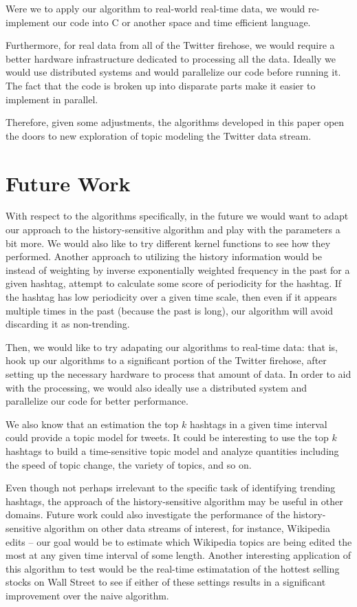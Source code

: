 \documentclass[twoside]{article}
\begin{document}
{Were we to apply our algorithm to real-world real-time data, we would re-implement our code into C or another space and time efficient language. 

Furthermore, for real data from all of the Twitter firehose, we would require a better hardware infrastructure dedicated to processing all the data. Ideally we would use distributed systems and would
parallelize our code before running it. The fact that the code is broken up into disparate parts make it easier to implement in parallel.

Therefore, given some adjustments, the algorithms developed in this paper open the doors to new exploration of topic modeling the Twitter data stream.


\section{Future Work} \label{sec:Future Work}

With respect to the algorithms specifically, in the future we would want to adapt our approach to the history-sensitive algorithm and play with the parameters a bit more. We would also like to try different kernel functions to see how they performed. Another approach to utilizing the history information would be instead of weighting by inverse exponentially weighted frequency in the past for a given hashtag, attempt to calculate some score of periodicity for the hashtag. If the hashtag has low periodicity over a given time scale, then even if it appears multiple times in the past (because the past is long), our algorithm will avoid discarding it as non-trending.

Then, we would like to try adapating our algorithms to real-time data: that is, hook up our algorithms to a significant portion of the Twitter firehose, after setting up the necessary hardware to process that amount of data. In order to aid with the processing, we would also ideally use a distributed system and parallelize
our code for better performance.

We also know that an estimation the top $k$ hashtags in a given time interval could provide a topic model for tweets. It could be interesting to use the top $k$ hashtags to build a time-sensitive topic model and analyze quantities including the speed of topic change, the variety of topics, and so on.

Even though not perhaps irrelevant to the specific task of identifying trending hashtags, 
the approach of the history-sensitive algorithm may be useful in other domains.
Future work could also investigate the performance of the history-sensitive algorithm on other data streams of interest, for instance, Wikipedia edits -- our goal would be to estimate which Wikipedia topics are being edited the most at any given time interval of some length. Another interesting application of this algorithm to test would be the real-time estimatation of the hottest selling stocks on Wall Street to see if either of these settings results in a significant improvement over the naive algorithm.

}
\end{document}
